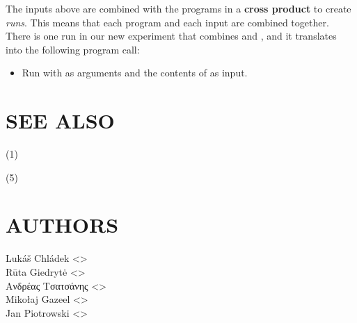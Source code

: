 \documentclass[a4paper,english]{article}
\begin{document}
\begin{adjustwidth}{18pt}{0pt}
    The inputs above are combined with the programs in a \textbf{cross product}
    to create \emph{runs}.
    This means that each program and each input are combined together.
    There is one run in our new experiment that combines  and
    , and it translates into the following program call:
    \begin{itemize}
    \item Run  with  as arguments and
    the contents of  as input.
    \end{itemize}

    \section{SEE ALSO}

    (1)

    (5)

    \section{AUTHORS}
    Lukáš Chládek <>\\[0.1cm]\MANbr
    Rūta Giedrytė <>\\[0.1cm]\MANbr
    Ανδρέας Τσατσάνης <>\\[0.1cm]\MANbr
    Mikołaj Gazeel <>\\[0.1cm]\MANbr
    Jan Piotrowski <>
\end{adjustwidth}
\end{document}
